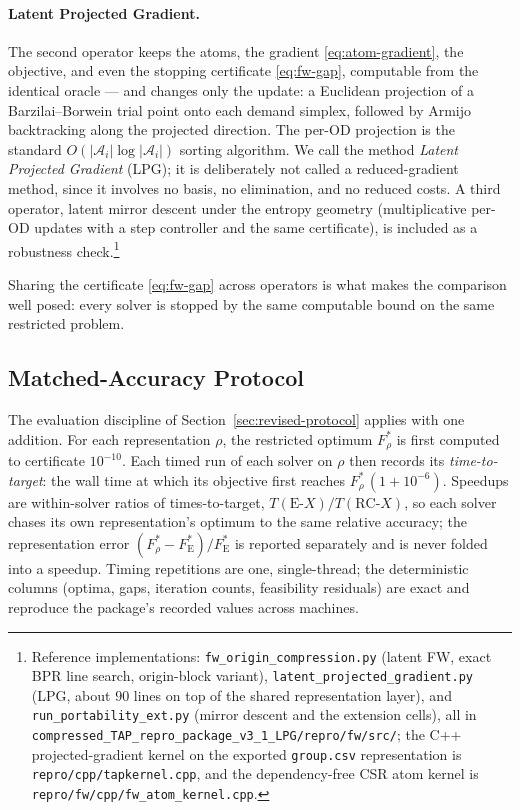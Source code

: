 \paragraph{Latent Projected Gradient.}
The second operator keeps the atoms, the gradient
\eqref{eq:atom-gradient}, the objective, and even the stopping
certificate \eqref{eq:fw-gap}, computable from the identical oracle ---
and changes only the update: a Euclidean projection of a
Barzilai--Borwein trial point onto each demand simplex, followed by
Armijo backtracking along the projected direction. The per-OD
projection is the standard $O(|\mathcal A_i| \log |\mathcal A_i|)$
sorting algorithm. We call the method \emph{Latent Projected Gradient}
(LPG); it is deliberately not called a reduced-gradient method, since it
involves no basis, no elimination, and no reduced costs. A third
operator, latent mirror descent under the entropy geometry
(multiplicative per-OD updates with a step controller and the same
certificate), is included as a robustness check.\footnote{Reference
implementations: \texttt{fw\_origin\_compression.py} (latent FW, exact
BPR line search, origin-block variant),
\texttt{latent\_projected\_gradient.py} (LPG, about $90$ lines on top of
the shared representation layer), and
\texttt{run\_portability\_ext.py} (mirror descent and the extension
cells), all in
\texttt{compressed\_TAP\_repro\_package\_v3\_1\_LPG/repro/fw/src/}; the
C++ projected-gradient kernel on the exported \texttt{group.csv}
representation is \texttt{repro/cpp/tapkernel.cpp}, and the
dependency-free CSR atom kernel is \texttt{repro/fw/cpp/fw\_atom\_kernel.cpp}.}

Sharing the certificate \eqref{eq:fw-gap} across operators is what makes
the comparison well posed: every solver is stopped by the same
computable bound on the same restricted problem.

\subsection{Matched-Accuracy Protocol}
\label{sec:portability-protocol}

The evaluation discipline of Section~\ref{sec:revised-protocol} applies
with one addition. For each representation $\rho$, the restricted
optimum $F^*_\rho$ is first computed to certificate $10^{-10}$. Each
timed run of each solver on $\rho$ then records its
\emph{time-to-target}: the wall time at which its objective first
reaches $F^*_\rho\,(1 + 10^{-6})$. Speedups are within-solver ratios of
times-to-target, $T(\mathrm{E}\text{-}X)/T(\mathrm{RC}\text{-}X)$, so
each solver chases its own representation's optimum to the same relative
accuracy; the representation error
$(F^*_\rho - F^*_{\mathrm E})/F^*_{\mathrm E}$ is reported separately
and is never folded into a speedup. Timing repetitions are one,
single-thread; the deterministic columns (optima, gaps, iteration
counts, feasibility residuals) are exact and reproduce the package's
recorded values across machines.

